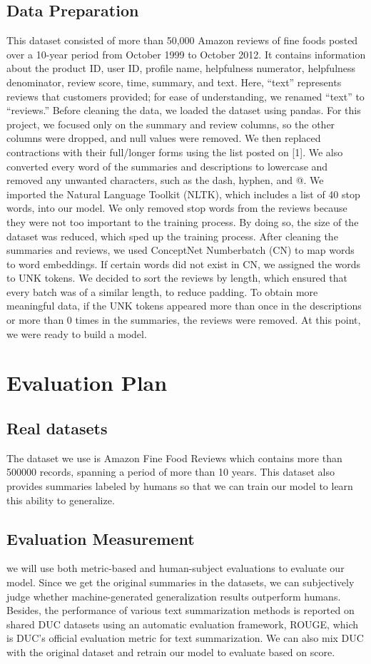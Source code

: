 \documentclass[conference]{IEEEtran}
\begin{document}
\subsection{Data Preparation}
This dataset consisted of more than 50,000 Amazon reviews of fine foods posted over a 10-year period from October 1999 to October 2012. It contains information about the product ID, user ID, profile name, helpfulness numerator, helpfulness denominator, review score, time, summary, and text. Here, “text” represents reviews that customers provided; for ease of understanding, we renamed “text” to “reviews.” Before cleaning the data, we loaded the dataset using pandas. For this project, we focused only on the summary and review columns, so the other columns were dropped, and null values were removed. We then replaced contractions with their full/longer forms using the list posted on [1]. We also converted every word of the summaries and descriptions to lowercase and removed any unwanted characters, such as the dash, hyphen, and @. We imported the Natural Language Toolkit (NLTK), which includes a list of 40 stop words, into our model. We only removed stop words from the reviews because they were not too important to the training process. By doing so, the size of the dataset was reduced, which sped up the training process. After cleaning the summaries and reviews, we used ConceptNet Numberbatch (CN) to map words to word embeddings. If certain words did not exist in CN, we assigned the words to UNK tokens. We decided to sort the reviews by length, which ensured that every batch was of a similar length, to reduce padding. To obtain more meaningful data, if the UNK tokens appeared more than once in the descriptions or more than 0 times in the summaries, the reviews were removed. At this point, we were ready to build a model.

\section{Evaluation Plan}
\subsection{Real datasets}
The dataset we use is Amazon Fine Food Reviews which contains more than 500000 records, spanning a period of more than 10 years. This dataset also provides summaries labeled by humans so that we can train our model to learn this ability to generalize. 
\subsection{Evaluation Measurement}
we will use both metric-based and human-subject evaluations to evaluate our model. Since we get the original summaries in the datasets, we can subjectively judge whether machine-generated generalization results outperform humans.  Besides, the performance of various text summarization methods is reported on shared DUC datasets using an automatic evaluation framework, ROUGE, which is DUC’s official evaluation metric for text summarization. We can also mix DUC with the original dataset and retrain our model to evaluate based on score.


\end{document}
